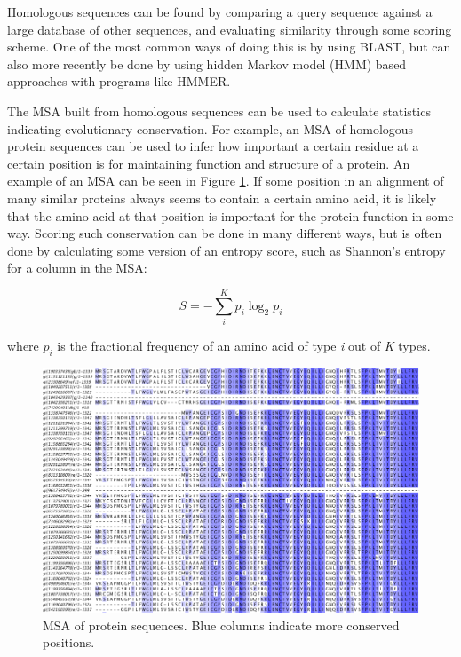 Homologous sequences can be found by comparing a query sequence against a large database of other sequences, and evaluating similarity through some scoring scheme. One of the most common ways of doing this is by using BLAST\cite{altschul1990basic}, but can also more recently be done by using hidden Markov model (HMM) based approaches with programs like HMMER.\cite{eddy2009new}

The MSA built from homologous sequences can be used to calculate statistics indicating evolutionary conservation. For example, an MSA of homologous protein sequences can be used to infer how important a certain residue at a certain position is for maintaining function and structure of a protein.\cite{valdar2002scoring} An example of an MSA can be seen in Figure \ref{fig:msa}. If some position in an alignment of many similar proteins always seems to contain a certain amino acid, it is likely that the amino acid at that position is important for the protein function in some way. Scoring such conservation can be done in many different ways, but is often done by calculating some version of an entropy score, such as Shannon's entropy for a column in the MSA\cite{valdar2002scoring}:

\begin{equation}
S = -\sum_{i}^{K} p_i \log_2 p_i
\end{equation}

where $p_i$ is the fractional frequency of an amino acid of type \textit{i} out of \textit{K} types.

\begin{figure}
  \centering
  \hspace*{-0.8in}
  \includegraphics[scale=0.5]
    {msa_example_edited.png}
  \centering
  \caption{ MSA of protein sequences. Blue columns indicate more conserved positions. }
  \label{fig:msa}
\end{figure}


